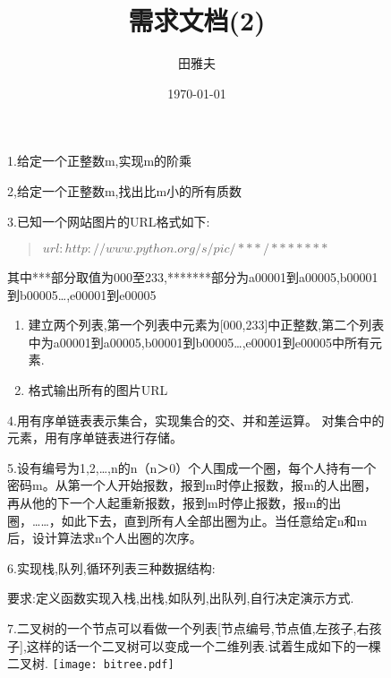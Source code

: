 \documentclass[12pt,a4paper]{article}
\title{需求文档(2)}	%
\author{田雅夫}
\date{\today}
\begin{document}
\maketitle

\begin{figure}[H]
1.给定一个正整数m,实现m的阶乘

\end{figure}

\begin{figure}[H]
2,给定一个正整数m,找出比m小的所有质数

\end{figure}

\begin{figure}[H]
3.已知一个网站图片的URL格式如下:
\begin{quote}
$url:http://www.python.org/s/pic/***/*******$
\end{quote}

其中***部分取值为000至233,*******部分为a00001到a00005,b00001到b00005\dots,e00001到e00005
\begin{enumerate}
\item 建立两个列表,第一个列表中元素为[000,233]中正整数,第二个列表中为a00001到a00005,b00001到b00005\dots,e00001到e00005中所有元素.
\item 格式输出所有的图片URL
\end{enumerate}
\end{figure}

\begin{figure}[H]
4.用有序单链表表示集合，实现集合的交、并和差运算。
 对集合中的元素，用有序单链表进行存储。
\end{figure}

\begin{figure}[H]
5.设有编号为1,2,…,n的n（n＞0）个人围成一个圈，每个人持有一个密码m。从第一个人开始报数，报到m时停止报数，报m的人出圈，再从他的下一个人起重新报数，报到m时停止报数，报m的出圈，……，如此下去，直到所有人全部出圈为止。当任意给定n和m后，设计算法求n个人出圈的次序。

\end{figure}

\begin{figure}[H]
6.实现栈,队列,循环列表三种数据结构:

要求:定义函数实现入栈,出栈,如队列,出队列,自行决定演示方式.

\end{figure}

\begin{figure}[H]
7.二叉树的一个节点可以看做一个列表[节点编号,节点值,左孩子,右孩子],这样的话一个二叉树可以变成一个二维列表.试着生成如下的一棵二叉树.
\texttt{[image: bitree.pdf]}

\end{figure}
\end{document}
